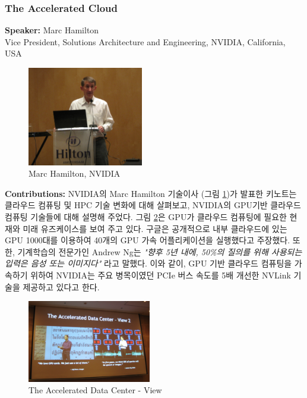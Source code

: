 \documentclass[twocolumn]{article}
\begin{document}
\subsubsection{The Accelerated Cloud}
\textbf{Speaker:} Marc Hamilton\\
Vice President, Solutions Architecture and Engineering, NVIDIA, California, USA
\begin{figure}[htb]
        \centering
        \includegraphics[width=0.45\textwidth]{marc.png}
        \caption{Marc Hamilton, NVIDIA}
        \label{fig:marc}
\end{figure}

\noindent
\textbf{Contributions:}  NVIDIA의 Marc Hamilton 기술이사 (그림 \ref{fig:marc})가 발표한 키노트는 
클라우드 컴퓨팅 및 HPC 기술 변화에 대해 살펴보고, NVIDIA의 GPU기반 클라우드 컴퓨팅 기술들에 대해 설명해 주었다. 
그림 \ref{fig:accelerated-data-center}은 GPU가 클라우드 컴퓨팅에 필요한 현재와 미래 유즈케이스를 보여 주고 있다.
구글은 공개적으로 내부 클라우드에 있는 GPU 1000대를 이용하여 40개의 GPU 가속 어플리케이션을 실행했다고 주장했다.
또한, 기계학습의 전문가인 Andrew Ng는 \textit{"향후 5년 내에, 50\%의 질의를 위해 사용되는 입력은 음성 또는 이미지다"} 라고 말했다.
이와 같이, GPU 기반 클라우드 컴퓨팅을 가속하기 위하여 NVIDIA는 주요 병목이였던 PCIe 버스 속도를 5배 개선한 NVLink 기술을 제공하고 있다고 한다.

\begin{figure}[htb]
        \centering
        \includegraphics[width=0.48\textwidth]{marc-ppt.png}
        \caption{The Accelerated Data Center - View}
        \label{fig:accelerated-data-center}
\end{figure}
\end{document}
